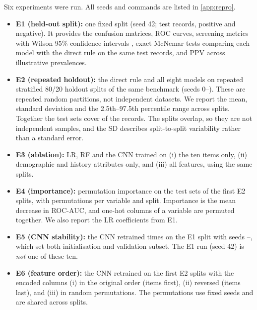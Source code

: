 \documentclass[5p,times,twocolumn]{elsarticle}
\begin{document}
Six experiments were run. All seeds and commands are listed in \ref{app:repro}.
\begin{itemize}
\item \textbf{E1 (held-out split):} one fixed split (seed 42; \NTest{} test records, \NTestPos{} positive and \NTestNeg{} negative). It provides the confusion matrices, ROC curves, screening metrics with Wilson 95\% confidence intervals \cite{wilson1927}, exact McNemar tests \cite{mcnemar1947} comparing each model with the direct rule on the same test records, and PPV across illustrative prevalences.
\item \textbf{E2 (repeated holdout):} the direct rule and all eight models on \NSplits{} repeated stratified 80/20 holdout splits of the same benchmark (seeds 0--\the\numexpr{}\relax). These are repeated random partitions, not independent datasets. We report the mean, standard deviation and the 2.5th--97.5th percentile range across splits. Together the test sets cover \NUniqueTest{} of the \NRecords{} records. The splits overlap, so they are not independent samples, and the SD describes split-to-split variability rather than a standard error.
\item \textbf{E3 (ablation):} LR, RF and the CNN trained on (i) the ten items only, (ii) demographic and history attributes only, and (iii) all features, using the same \NSplits{} splits.
\item \textbf{E4 (importance):} permutation importance on the test sets of the first \NImpSplits{} E2 splits, with \NPerm{} permutations per variable and split. Importance is the mean decrease in ROC-AUC, and one-hot columns of a variable are permuted together. We also report the LR coefficients from E1.
\item \textbf{E5 (CNN stability):} the CNN retrained \NInits{} times on the E1 split with seeds \InitSeedMin--\InitSeedMax, which set both initialisation and validation subset. The E1 run (seed 42) is \emph{not} one of these ten.
\item \textbf{E6 (feature order):} the CNN retrained on the first \NOrderSplits{} E2 splits with the encoded columns (i) in the original order (items first), (ii) reversed (items last), and (iii) in \NRandOrders{} random permutations. The permutations use fixed seeds and are shared across splits.
\end{itemize}
\end{document}
